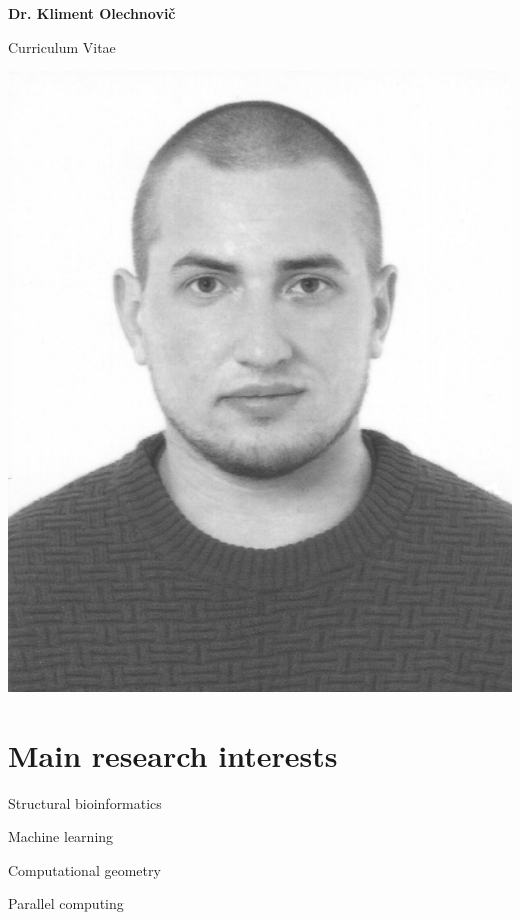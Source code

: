 \documentclass{article}
\def\name{Dr. Kliment Olechnovič}
\newenvironment{itemize_tight}{
\begin{itemize}
  \setlength{\itemsep}{3pt}
  \setlength{\parskip}{0pt}
  \setlength{\parsep}{0pt}
}{\end{itemize}}
\begin{document}
\begin{minipage}{0.75\linewidth}
\begin{center}
{\huge \bf \name}
\end{center}

\begin{center}
{\Large Curriculum Vitae}
\end{center}
\end{minipage}
\begin{minipage}{0.25\linewidth}
\includegraphics[width=\linewidth]{photo.jpg}
\end{minipage}


\section*{Main research interests}

\begin{minipage}{0.3\linewidth}
\begin{itemize_tight}
  \item Structural bioinformatics
  \item Machine learning
\end{itemize_tight}
\end{minipage}
\begin{minipage}{0.7\linewidth}
\begin{itemize_tight}
  \item Computational geometry
  \item Parallel computing
\end{itemize_tight}
\end{minipage}
\end{document}
